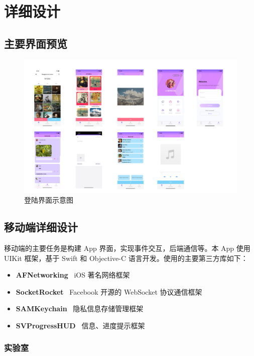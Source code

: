 \section{详细设计}

\subsection{主要界面预览}
\begin{figure}[H]
    \centering
    \includegraphics[width=
    \textwidth]{figures/预览}
    \caption{登陆界面示意图}
    \label{fig:my_label}
\end{figure}

\subsection{移动端详细设计}


移动端的主要任务是构建 App 界面，实现事件交互，后端通信等。本 App 使用 UIKit 框架，基于 Swift 和 Objective-C 语言开发。使用的主要第三方库如下：

\begin{itemize}
	\item \textbf{AFNetworking} \ iOS 著名网络框架
	\item \textbf{SocketRocket} \ Facebook 开源的 WebSocket 协议通信框架
	\item \textbf{SAMKeychain} \ 隐私信息存储管理框架
	\item \textbf{SVProgressHUD} \ 信息、进度提示框架
\end{itemize}

\subsubsection{实验室}

